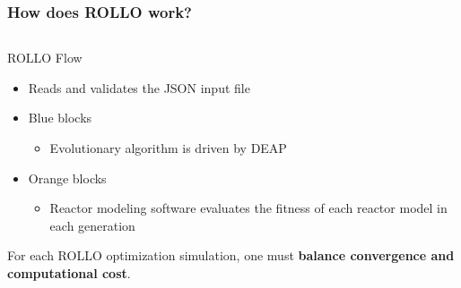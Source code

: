 \begin{frame}
    \frametitle{How does ROLLO work?}
    \begin{columns}
        \begin{column}{0.7\textwidth}

            \vspace{-0.5cm}
            ROLLO Flow 
            \begin{itemize}
                \item Reads and validates the JSON input file
                \item Blue blocks 
                \begin{itemize}
                    \item Evolutionary algorithm is driven by \acrfull{DEAP} 
                \end{itemize}
                \item Orange blocks
                \begin{itemize}
                    \item Reactor modeling software evaluates the fitness of each 
                    reactor model in each generation 
                \end{itemize}
            \end{itemize}

            \vspace{0.2cm}
            For each ROLLO optimization simulation, one must \textbf{balance convergence and 
            computational cost}. 


\end{column}
\end{columns}
\end{frame}
